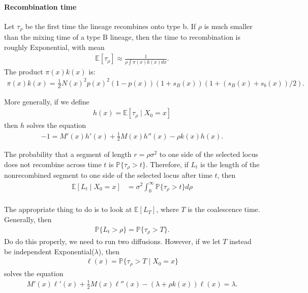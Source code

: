 \documentclass{article}
\newcommand{\E}{\mathbb{E}}
\renewcommand{\P}{\mathbb{P}}
\newcommand{\given}{\;\vert\;}
\begin{document}
\paragraph{Recombination time}
Let $\tau_\rho$ be the first time  the lineage recombines onto type b.
If $\rho$ is much smaller than the mixing time of a type B lineage,
then the time to recombination is roughly Exponential,
with mean
\begin{align}
    \E[\tau_\rho] \approx \frac{1}{ \rho \int \pi(x) k(x) dx } .
\end{align}
The product $\pi(x) k(x)$ is:
\begin{align}
    \pi(x) k(x) = \frac{1}{Z} N(x)^2 p(x)^2 (1-p(x)) (1+s_B(x)) (1+(s_B(x)+s_b(x))/2) .
\end{align}

More generally, if we define
\begin{align}
    h(x) = \E[\tau_\rho \given X_0 = x]
\end{align}
then $h$ solves the equation
\begin{align}
    -1 = M'(x) h'(x) + \frac{1}{2} M(x) h''(x) - \rho k(x) h(x) .
\end{align}

The probability that a segment of length $r = \rho \sigma^2$ to one side of the selected locus
does not recombine across time $t$ is $\P\{\tau_\rho > t\}$.
Therefore, if $L_t$ is the length of the nonrecombined segment to one side of the selected locus
after time $t$, then
\begin{align}
    \E[ L_t \given X_0=x ] &= \sigma^2 \int_0^\infty \P\{ \tau_\rho > t \} d\rho \\
\end{align}

The appropriate thing to do is to look at $\E[L_T]$, where $T$ is the coalescence time.
Generally, then
\begin{align}
  \P\{ L_t > \rho \} = \P\{ \tau_\rho > T \} .
\end{align}
Do do this properly, we need to run two diffusions.
However, if we let $T$ instead be independent Exponential($\lambda$), then 
\begin{align}
  \ell(x) = \P\{ \tau_\rho > T \given X_0 = x\} 
\end{align}
solves the equation
\begin{align}
  M'(x) \ell'(x) + \frac{1}{2} M(x) \ell''(x) - (\lambda + \rho k(x) ) \ell(x) = \lambda .
\end{align}
\end{document}
